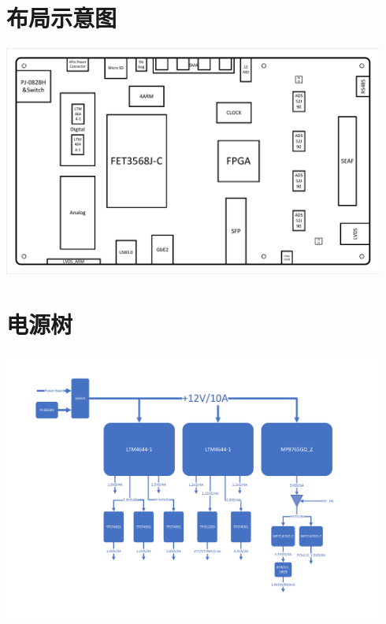
\chapter{布局示意图}
\label{apd:DPU_Layout}
\centering
\includegraphics*[angle=270,width=0.94\textwidth]{./figures/DPU_Layout.pdf}

\chapter{电源树}
\label{apd:power}
\centering
\includegraphics*[angle=270,width=0.94\textwidth]{./figures/Power.pdf}
